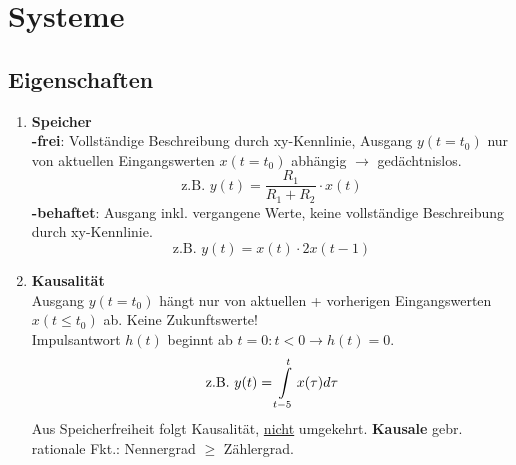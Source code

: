 \clearpage
\section{Systeme}
\subsection{Eigenschaften}
\begin{enumerate}
\small
  \item{\textbf{Speicher}}\\
          \textbf{-frei}: Vollständige Beschreibung durch xy-Kennlinie, Ausgang $y(t=t_0)$ nur von aktuellen Eingangswerten $x(t=t_0)$ abhängig $\rightarrow$ gedächtnislos.\\
          \[
              \text{z.B. \ }y(t)=\frac{R_1}{R_1+R_2}\cdot x(t)
          \]
          \textbf{-behaftet}: Ausgang inkl. vergangene Werte, keine vollständige Beschreibung durch xy-Kennlinie.\\
          \[
              \text{z.B. \ }y(t) = x(t)\cdot 2x(t-1)
          \]
  \item{\textbf{Kausalit\"at}}\\
           Ausgang $y(t=t_0)$ hängt nur von aktuellen + vorherigen
           Eingangswerten $x(t\le t_0)$ ab. Keine Zukunftswerte! \\
           Impulsantwort $h(t)$ beginnt ab $t=0: t<0 \rightarrow h(t)=0$.
          \[
              \text{z.B.\ }y(t) =
              \int\displaylimits_{t-5}^{t}x(\tau)d\tau
          \]
 Aus Speicherfreiheit folgt Kausalität, \underline{nicht} umgekehrt.
 \textbf{Kausale} gebr. rationale Fkt.: Nennergrad $\ge$ Zählergrad.
 

\end{enumerate}

